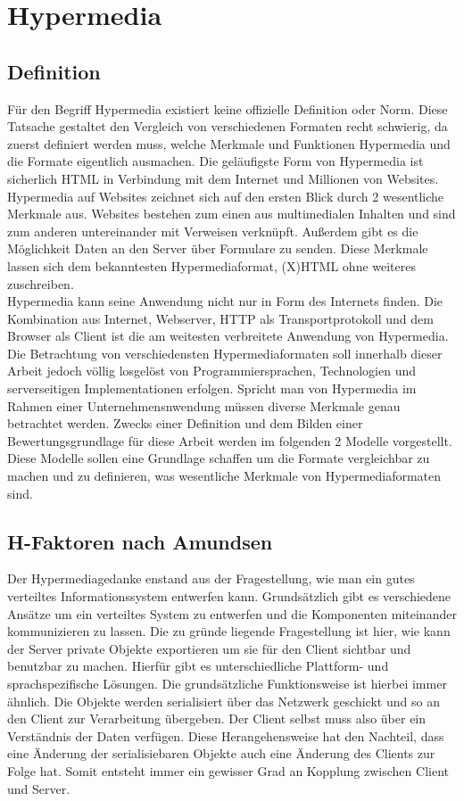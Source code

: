 \newpage
\section{Hypermedia}

\subsection{Definition}
Für den Begriff Hypermedia existiert keine offizielle Definition oder Norm. Diese Tatsache gestaltet den Vergleich von verschiedenen Formaten recht schwierig, da zuerst definiert werden muss, welche Merkmale und Funktionen Hypermedia und die Formate eigentlich ausmachen. Die geläufigste Form von Hypermedia ist sicherlich HTML in Verbindung mit dem Internet und Millionen von Websites. Hypermedia auf Websites zeichnet sich auf den ersten Blick durch 2 wesentliche Merkmale aus. Websites bestehen zum einen aus multimedialen Inhalten und sind zum anderen untereinander mit Verweisen verknüpft. Außerdem gibt es die Möglichkeit Daten an den Server über Formulare zu senden. Diese Merkmale lassen sich dem bekanntesten Hypermediaformat, (X)HTML ohne weiteres zuschreiben.\\
Hypermedia kann seine Anwendung nicht nur in Form des Internets finden. Die Kombination aus Internet, Webserver, HTTP als Transportprotokoll und dem Browser als Client ist die am weitesten verbreitete Anwendung von Hypermedia. Die Betrachtung von verschiedensten Hypermediaformaten soll innerhalb dieser Arbeit jedoch völlig losgelöst von Programmiersprachen, Technologien und serverseitigen Implementationen erfolgen. Spricht man von Hypermedia im Rahmen einer Unternehmensnwendung müssen diverse Merkmale genau betrachtet werden. Zwecks einer Definition und dem Bilden einer Bewertungsgrundlage für diese Arbeit werden im folgenden 2 Modelle vorgestellt. Diese Modelle sollen eine Grundlage schaffen um die Formate vergleichbar zu machen und zu definieren, was wesentliche Merkmale von Hypermediaformaten sind.

\subsection{H-Faktoren nach Amundsen}
Der Hypermediagedanke enstand aus der Fragestellung, wie man ein gutes verteiltes Informationssystem entwerfen kann. Grundsätzlich gibt es verschiedene Ansätze um ein verteiltes System zu entwerfen und die Komponenten miteinander kommunizieren zu lassen. Die zu gründe liegende Fragestellung ist hier, wie kann der Server private Objekte exportieren um sie für den Client sichtbar und benutzbar zu machen. Hierfür gibt es unterschiedliche Plattform- und sprachspezifische Lösungen. Die grundsätzliche Funktionsweise ist hierbei immer ähnlich. Die Objekte werden serialisiert über das Netzwerk geschickt und so an den Client zur Verarbeitung übergeben. Der Client selbst muss also über ein Verständnis der Daten verfügen. Diese Herangehensweise hat den Nachteil, dass eine Änderung der serialisiebaren Objekte auch eine Änderung des Clients zur Folge hat. Somit entsteht immer ein gewisser Grad an Kopplung zwischen Client und Server.\\

